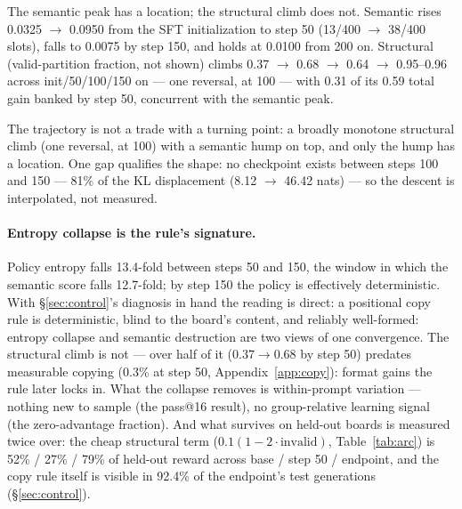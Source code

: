 \documentclass{article}
\begin{document}
The semantic peak has a location; the structural climb does not. Semantic
rises 0.0325 $\to$ 0.0950 from the SFT initialization to step 50 (13/400
$\to$ 38/400 slots), falls to 0.0075 by step 150, and holds at 0.0100 from
200 on. Structural (valid-partition fraction, not shown) climbs 0.37 $\to$
0.68 $\to$ 0.64 $\to$ 0.95--0.96 across init/50/100/150 on --- one
reversal, at 100 --- with 0.31 of its 0.59 total gain banked by step 50,
concurrent with the semantic peak.

The trajectory is not a trade with a turning point: a broadly monotone
structural climb (one reversal, at 100) with a semantic hump on top, and
only the hump has a location. One gap qualifies the shape: no checkpoint
exists between steps 100 and 150 --- 81\% of the KL displacement (8.12
$\to$ 46.42 nats) --- so the descent is interpolated, not measured.

\paragraph{Entropy collapse is the rule's signature.} Policy entropy falls
13.4-fold between steps 50 and 150, the window in which the semantic score
falls 12.7-fold; by step 150 the policy is effectively deterministic. With
\S\ref{sec:control}'s diagnosis in hand the reading is direct: a positional
copy rule is deterministic, blind to the board's content, and reliably
well-formed: entropy collapse and semantic destruction are two views of
one convergence. The structural climb is not --- over half of it ($0.37
\to 0.68$ by step 50) predates measurable copying (0.3\% at step 50,
Appendix~\ref{app:copy}): format gains the rule later locks in. What the collapse
removes is within-prompt variation --- nothing new to sample (the pass@16
result), no group-relative learning signal (the zero-advantage fraction).
And what survives on held-out boards is measured twice over: the cheap
structural term ($0.1(1-2\cdot\text{invalid})$, Table~\ref{tab:arc}) is
52\% / 27\% / 79\% of held-out reward across base / step 50 / endpoint,
and the copy rule itself is visible in 92.4\% of the endpoint's test
generations (\S\ref{sec:control}).
\end{document}
